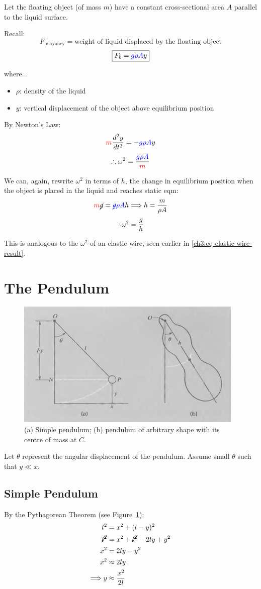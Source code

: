 Let the floating object (of mass $m$) have a constant cross-sectional area $A$ parallel to the liquid surface.

Recall:
\[ F_\text{buoyancy} = \text{weight of liquid displaced by the floating object} \]
\[ \boxed{F_b  = \textcolor{blue}{g\rho A}y} \]

where...
\begin{itemize}
	\item $\rho$: density of the liquid
	\item $y$: vertical displacement of the object above equilibrium position
\end{itemize}


By Newton's Law:
\[ \textcolor{red}{m}\frac{d^2y}{dt^2} = -\textcolor{blue}{g\rho A}y \]
\[ \therefore \omega^2 = \frac{\textcolor{blue}{g\rho A}}{\textcolor{red}{m}} \]

We can, again, rewrite $\omega^2$ in terms of $h$, the change in equilibrium position when the object is placed in the liquid and reaches static eqm:
\[ \textcolor{red}{m}\cancel{g}=\textcolor{blue}{\cancel{g}\rho A} h
\Longrightarrow
h = \frac{m}{\rho A} \]
\[ \therefore \omega^2 = \frac{g}{h} \]


This is analogous to the $\omega^2$ of an elastic wire, seen earlier in \eqref{ch3:eq-elastic-wire-result}. 


\section{The Pendulum}
\begin{figure}[h]
	\centering
	\includegraphics[scale=0.6]{phys232/Ch3-pendulum.png} \caption{(a) Simple pendulum; (b) pendulum of arbitrary shape with its centre of mass at $C$.}\label{ch3:fig-pendulum}
\end{figure}

Let $\theta$ represent the angular displacement of the pendulum. Assume small $\theta$ such that $y \ll x$. 


\subsection{Simple Pendulum} \label{ch3:sec-simple-pendulum}
By the Pythagorean Theorem (see Figure~\ref{ch3:fig-pendulum}):
\begin{align}
l^2 &= x^2 + (l-y)^2  \notag \\	
\cancel{l^2} &= x^2 + \cancel{l^2} - 2ly + y^2 \notag \\
x^2 &= 2ly - {y^2} \notag \\
x^2 &\approx 2ly  \notag \\
\Longrightarrow y &\approx \frac{x^2}{2l} \label{ch3:eq-pendulum-pythag}
\end{align}

